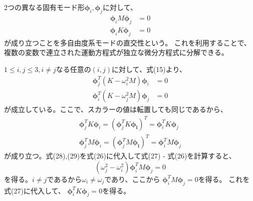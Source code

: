 \documentclass[a4paper]{jsarticle}
\begin{document}
\subsection{}
2つの異なる固有モード形$\boldsymbol{\phi}_i, \boldsymbol{\phi}_j$に対して、
\begin{align}
  \boldsymbol{\phi}_i M \boldsymbol{\phi}_j & = 0 \\
  \boldsymbol{\phi}_i K \boldsymbol{\phi}_j & = 0
\end{align}
が成り立つことを多自由度系モードの直交性という。
これを利用することで、複数の変数で連立された運動方程式が独立な微分方程式に分解できる。\par
$1 \leq i, j \leq 3, i \neq j$なる任意の$(i, j)$に対して、式(15)より、
\begin{align}
  \boldsymbol{\phi}_j^T (K - \omega_i^2 M) \boldsymbol{\phi}_i & = 0 \\
  \boldsymbol{\phi}_i^T (K - \omega_j^2 M) \boldsymbol{\phi}_j & = 0
\end{align}
が成立している。ここで、スカラーの値は転置しても同じであるから、
\begin{align}
  \boldsymbol{\phi}_j^T K \boldsymbol{\phi}_i =
  \left(\boldsymbol{\phi}_j^T K \boldsymbol{\phi_i}\right)^T =
  \boldsymbol{\phi}_i^T K \boldsymbol{\phi}_j \\
  \boldsymbol{\phi}_j^T M \boldsymbol{\phi}_i =
  \left(\boldsymbol{\phi}_j^T M \boldsymbol{\phi_i}\right)^T =
  \boldsymbol{\phi}_i^T M \boldsymbol{\phi}_j
\end{align}
が成り立つ。式(28),(29)を式(26)に代入して式(27) - 式(26)を計算すると、
\begin{equation}
  (\omega_j^2 - \omega_i^2) \boldsymbol{\phi}_i^T M \boldsymbol{\phi}_j = 0
\end{equation}
を得る。$i \neq j$であるから$\omega_i \neq \omega_j$であり、ここから
$\boldsymbol{\phi}_i^T M \boldsymbol{\phi}_j = 0$を得る。
これを式(27)に代入して、
$\boldsymbol{\phi}_i^T K \boldsymbol{\phi}_j = 0$を得る。
\end{document}
